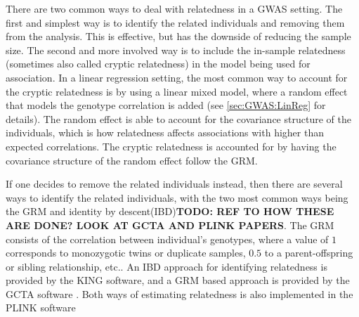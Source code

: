There are two common ways to deal with relatedness in a GWAS setting. The first and simplest way is to identify the related individuals and removing them from the analysis. This is effective, but has the downside of reducing the sample size. The second and more involved way is to include the in-sample relatedness (sometimes also called cryptic relatedness) in the model being used for association. In a linear regression setting, the most common way to account for the cryptic relatedness is by using a linear mixed model, where a random effect that models the genotype correlation is added (see \cref{sec:GWAS:LinReg} for details). The random effect is able to account for the covariance structure of the individuals, which is how relatedness affects associations with higher than expected correlations\cite{yu2006unified, kang2008efficient}. The cryptic relatedness is accounted for by having the covariance structure of the random effect follow the GRM.

If one decides to remove the related individuals instead, then there are several ways to identify the related individuals, with the two most common ways being the GRM and identity by descent(IBD)\textbf{TODO: REF TO HOW THESE ARE DONE? LOOK AT GCTA AND PLINK PAPERS}. The GRM consists of the correlation between individual's genotypes, where a value of $ 1 $ corresponds to monozygotic twins or duplicate samples, $ 0.5 $ to a parent-offspring or sibling relationship, etc.. %
An IBD approach for identifying relatedness is provided by the KING software\cite{manichaikul2010robust}, and a GRM based approach is provided by the GCTA software \cite{yang2011gcta}. Both ways of estimating relatedness is also implemented in the PLINK software\cite{chang2015second,purcell2007plink}


